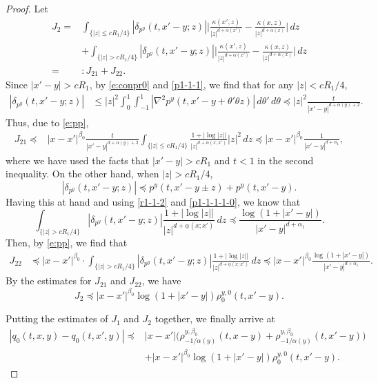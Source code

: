 \documentclass[a4paper,11pt]{amsart}
\renewcommand{\le}{\leqslant}
\newcommand{\B}{\beta}
\newcommand{\p}{\preceq}
\newcommand{\A}{\alpha}
\theoremstyle{definition}
\begin{document}
\begin{proof}
Let \begin{equation}\label{p3-1-4a}
\begin{split}
J_2=&\int_{\{|z|\le {cR_1}/{4}\}} |\delta_{p^y}(t,x'-y;z)| \bigg|\frac{\kappa(x',z)}{|z|^{d+\alpha(x')}}-\frac{\kappa(x,z)}{|z|^{d+\alpha(x)}} \bigg|\,dz\\
&+ \int_{\{|z|> {cR_1}/{4}\}} |\delta_{p^y}(t,x'-y;z)| \bigg|\frac{\kappa(x',z)}{|z|^{d+\alpha(x')}}-\frac{\kappa(x,z)}{|z|^{d+\alpha(x)}} \bigg|\,dz\\
=&:J_{21}+J_{22}.
\end{split}
\end{equation}
Since $|x'-y|>cR_1$, by \eqref{e:conpr0} and \eqref{p1-1-1}, we find that for any $|z|<{cR_1}/{4} $,
\begin{align*}|\delta_{p^y}(t,x'-y;z)|&\le |z|^2\int_0^1\int_{-1}^1 |\nabla^2 p^y(t,x'-y+\theta'\theta z)|\,d\theta'\,d\theta \p |z|^2 \frac{ t}{ |x'-y|^{d+\A(y)+2}}.\end{align*}
 Thus,
 due to \eqref{e:pp},
 \begin{align*}J_{21} \p& |x-x'|^{\B_0} \frac{t}{|x'-y|^{d+\A(y)+2}}\int_{\{|z|\le {cR_1}/{4}\}} \!\!\frac{1+|\log |z||}{|z|^{d+\overline\A(x;x')}}|z|^2\,dz
 \p  |x-x'|^{\B_0} \frac{1}{|x'-y|^{d+\A_1}},\end{align*} where we have used the facts that $|x'-y|>cR_1$ and $t<1$ in the second inequality.
On the other hand, when $|z|> {cR_1}/{4}$,
$$|\delta_{p^y}(t,x'-y;z)|\p p^y(t,x'-y\pm z)+p^y(t,x'-y).$$
Having this at hand and using \eqref{r1-1-2} and \eqref{p1-1-1-1-0}, we know that
$$\int_{\{|z|>{cR_1}/{4}\}} |\delta_{p^y}(t,x'-y;z)|\frac{1+|\log|z||}{|z|^{d+\underline{\A}(x;x')}}\,dz
\p \frac{\log(1+|x'-y|)}{|x'-y|^{d+\A_1}}.$$
Then, by \eqref{e:pp}, we find that
\begin{align*}
J_{22}&\p |x-x'|^{\B_0}\cdot \int_{\{|z|>{cR_1}/{4}\}}|\delta_{p^y}(t,x'-y;z)|\frac{1+|\log|z||}{|z|^{d+\underline{\A}(x;x')}}\,dz  \p   |x-x'|^{\B_0}\frac{\log(1+|x'-y|)}{|x'-y|^{d+\A_1}}.
\end{align*}
By the estimates for $J_{21}$ and $J_{22}$, we have
\begin{equation*}
J_2\p |x-x'|^{\B_0}\log(1+|x'-y|)\rho^{y,0}_0(t,x'-y).
\end{equation*}

Putting the estimates of $J_1$ and $J_2$ together, we finally arrive at
\begin{align*}
|q_0(t,x,y)-q_0(t,x',y)|\p & |x-x'|\big( \rho_{-{1/\A(y)}}^{y,\B_0}(t,x-y)+\rho_{-{1/\A(y)}}^{y,\B_0}(t,x'-y)\big)\\
&+|x-x'|^{\B_0}\log(1+|x'-y|)\rho^{y,0}_0(t,x'-y).
\end{align*}


\end{proof}
\end{document}
